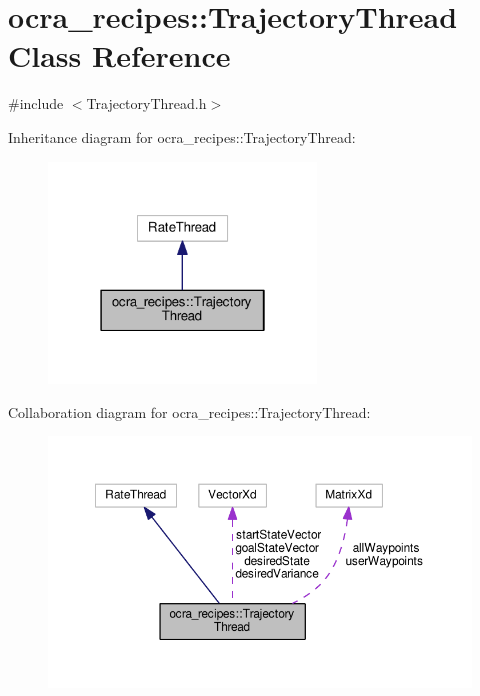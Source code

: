 \hypertarget{classocra__recipes_1_1TrajectoryThread}{}\section{ocra\+\_\+recipes\+:\+:Trajectory\+Thread Class Reference}
\label{classocra__recipes_1_1TrajectoryThread}


{\ttfamily \#include $<$Trajectory\+Thread.\+h$>$}



Inheritance diagram for ocra\+\_\+recipes\+:\+:Trajectory\+Thread\+:
\nopagebreak
\begin{figure}[H]
\begin{center}
\leavevmode
\includegraphics[width=202pt]{de/d23/classocra__recipes_1_1TrajectoryThread__inherit__graph}
\end{center}
\end{figure}


Collaboration diagram for ocra\+\_\+recipes\+:\+:Trajectory\+Thread\+:
\nopagebreak
\begin{figure}[H]
\begin{center}
\leavevmode
\includegraphics[width=350pt]{dc/de5/classocra__recipes_1_1TrajectoryThread__coll__graph}
\end{center}
\end{figure}

